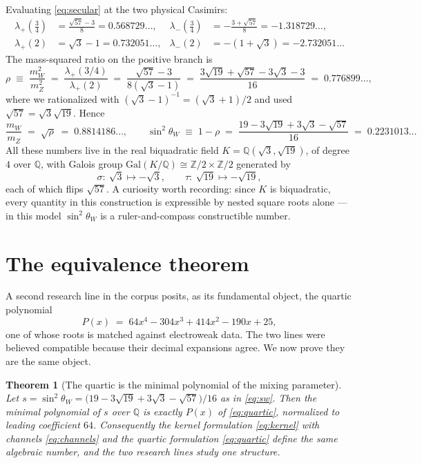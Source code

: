 \documentclass[11pt,a4paper]{article}
\newtheorem{theorem}{Theorem}
\theoremstyle{definition}
\newcommand{\swsq}{\sin^2\theta_W}
\begin{document}
Evaluating \eqref{eq:secular} at the two physical Casimirs:
\begin{align}
\lambda_+\!\left(\tfrac34\right) &= \frac{\sqrt{57}-3}{8} = 0.568729\ldots,
&
\lambda_-\!\left(\tfrac34\right) &= -\frac{3+\sqrt{57}}{8} = -1.318729\ldots,
\label{eq:lam34}\\[2pt]
\lambda_+(2) &= \sqrt{3}-1 = 0.732051\ldots,
&
\lambda_-(2) &= -(1+\sqrt{3}) = -2.732051\ldots
\label{eq:lam2}
\end{align}
The mass-squared ratio on the positive branch is
\begin{equation}
\rho \;\equiv\; \frac{m_W^2}{m_Z^2}
\;=\;\frac{\lambda_+(3/4)}{\lambda_+(2)}
\;=\;\frac{\sqrt{57}-3}{8(\sqrt3-1)}
\;=\;\frac{3\sqrt{19}+\sqrt{57}-3\sqrt3-3}{16}
\;=\;0.776899\ldots,
\label{eq:rho}
\end{equation}
where we rationalized with $(\sqrt3-1)^{-1}=(\sqrt3+1)/2$ and used
$\sqrt{57}=\sqrt3\sqrt{19}$. Hence
\begin{equation}
\frac{m_W}{m_Z} \;=\;\sqrt{\rho}\;=\;0.8814186\ldots,
\qquad
\swsq \;\equiv\; 1-\rho
\;=\;\frac{19-3\sqrt{19}+3\sqrt3-\sqrt{57}}{16}
\;=\;0.2231013\ldots
\label{eq:sw}
\end{equation}
All these numbers live in the real biquadratic field
$K=\mathbb{Q}(\sqrt3,\sqrt{19})$, of degree $4$ over $\mathbb{Q}$, with
Galois group $\mathrm{Gal}(K/\mathbb{Q})\cong
\mathbb{Z}/2\times\mathbb{Z}/2$ generated by
\[
\sigma:\ \sqrt3\mapsto-\sqrt3,\qquad
\tau:\ \sqrt{19}\mapsto-\sqrt{19},
\]
each of which flips $\sqrt{57}$. A curiosity worth recording: since $K$ is
biquadratic, every quantity in this construction is expressible by nested
square roots alone --- in this model $\swsq$ is a ruler-and-compass
constructible number.

\section{The equivalence theorem}
\label{sec:theorem}

A second research line in the corpus posits, as its fundamental object, the
quartic polynomial
\begin{equation}
P(x) \;=\; 64x^4-304x^3+414x^2-190x+25,
\label{eq:quartic}
\end{equation}
one of whose roots is matched against electroweak data. The two lines were
believed compatible because their decimal expansions agree. We now prove
they are the same object.

\begin{theorem}[The quartic is the minimal polynomial of the mixing
parameter]
\label{thm:quartic}
Let $s=\swsq=\bigl(19-3\sqrt{19}+3\sqrt3-\sqrt{57}\bigr)/16$ as in
\eqref{eq:sw}. Then the minimal polynomial of $s$ over $\mathbb{Q}$ is
exactly $P(x)$ of \eqref{eq:quartic}, normalized to leading coefficient
$64$. Consequently the kernel formulation \eqref{eq:kernel} with channels
\eqref{eq:channels} and the quartic formulation \eqref{eq:quartic} define
the same algebraic number, and the two research lines study one structure.
\end{theorem}
\end{document}
